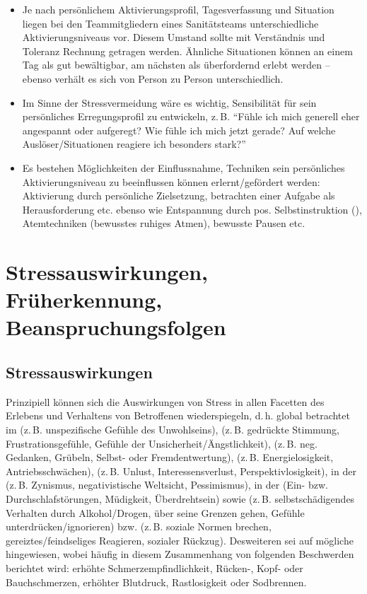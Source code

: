 \begin{itemize}
  \item Je nach persönlichem Aktivierungsprofil,
  Tagesverfassung und Situation liegen bei den
  Teammitgliedern eines Sanitätsteams unterschiedliche
  Aktivierungsniveaus vor. Diesem Umstand sollte mit
  Verständnis und Toleranz Rechnung getragen werden.
  Ähnliche Situationen können an einem Tag als gut
  bewältigbar, am nächsten als überfordernd erlebt werden --
  ebenso verhält es sich von Person zu Person
  unterschiedlich.
  \item Im Sinne der Stressvermeidung wäre es wichtig,
  Sensibilität für sein persönliches Erregungsprofil zu
  entwickeln, z.\,B. \enquote{Fühle ich mich generell eher
  angespannt oder aufgeregt? Wie fühle ich mich jetzt gerade? Auf welche
  Auslöser/Situationen reagiere ich besonders stark?}
  \item Es bestehen Möglichkeiten der Einflussnahme, Techniken
  sein persönliches Aktivierungsniveau zu beeinflussen können
  erlernt/gefördert werden: Aktivierung durch persönliche
  Zielsetzung, betrachten einer Aufgabe als Herausforderung
  etc. ebenso wie Entspannung durch pos. Selbstinstruktion
  (), Atemtechniken
  (bewusstes ruhiges Atmen), bewusste Pausen etc.
\end{itemize}


\section{Stressauswirkungen, Früherkennung, Beanspruchungsfolgen}



\subsection{Stressauswirkungen}
\label{topic:stressauswirkungen-psi}

Prinzipiell können sich die Auswirkungen von Stress in allen
Facetten des Erlebens und Verhaltens von Betroffenen
wiederspiegeln, d.\,h. global betrachtet im  (z.\,B. unspezifische Gefühle des
Unwohlseins),  (z.\,B. gedrückte
Stimmung, Frustrationsgefühle, Gefühle der
Unsicherheit/Ängstlichkeit), 
(z.\,B. neg. Gedanken, Grübeln, Selbst- oder
Fremdentwertung),  (z.\,B. Energielosigkeit,
Antriebsschwächen),  (z.\,B. Unlust,
Interessensverlust, Perspektivlosigkeit), in der
 (z.\,B.
Zynismus, negativistische Weltsicht, Pessimismus), in der
 (Ein- bzw. Durchschlafstörungen,
Müdigkeit, Überdrehtsein) sowie  (z.\,B. selbstschädigendes Verhalten durch
Alkohol/Drogen, über seine Grenzen gehen, Gefühle
unterdrücken/ignorieren) bzw.  (z.\,B. soziale Normen brechen,
gereiztes/feindseliges Reagieren, sozialer Rückzug).
Desweiteren sei auf mögliche 
hingewiesen, wobei häufig in diesem Zusammenhang von
folgenden Beschwerden berichtet wird: erhöhte
Schmerzempfindlichkeit, Rücken-, Kopf- oder Bauchschmerzen,
erhöhter Blutdruck, Rastlosigkeit oder Sodbrennen.

